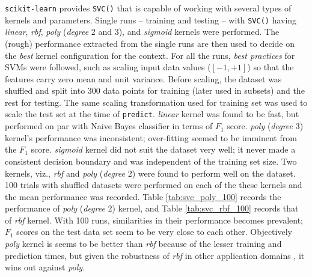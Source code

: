 \documentclass{article}
\begin{document}
	\texttt{scikit-learn} provides \texttt{SVC()} that is capable of working with several types of kernels and parameters. Single runs -- training and testing -- with \texttt{SVC()} having \emph{linear}, \emph{rbf}, \emph{poly} (\emph{degree} 2 and 3), and \emph{sigmoid} kernels were performed. The (rough) performance extracted from the single runs are then used to decide on the \emph{best} kernel configuration for the context. For all the runs, \emph{best practices} for SVMs \cite{hsu2003} were followed, such as scaling input data values ($[-1,+1]$) so that the features carry zero mean and unit variance. Before scaling, the dataset was shuffled and split into 300 data points for training (later used in subsets) and the rest for testing. The same scaling transformation used for training set was used to scale the test set at the time of \texttt{predict}. \emph{linear} kernel was found to be fast, but performed on par with Naive Bayes classifier in terms of $F_1$ score. \emph{poly} (\emph{degree} 3) kernel's performance was inconsistent; over-fitting seemed to be imminent from the $F_1$ score. \emph{sigmoid} kernel did not suit the dataset very well; it never made a consistent decision boundary and was independent of the training set size. Two kernels, viz., \emph{rbf} and \emph{poly} (\emph{degree} 2) were found to perform well on the dataset. 100 trials with shuffled datasets were performed on each of the these kernels and the mean performance was recorded. Table \ref{tab:svc_poly_100} records the performance of \emph{poly} (\emph{degree} 2) kernel, and Table \ref{tab:svc_rbf_100} records that of \emph{rbf} kernel. With 100 runs, similarities in their performance becomes prevalent; $F_1$ scores on the test data set seem to be very close to each other. Objectively \emph{poly} kernel is seems to be better than \emph{rbf} because of the lesser training and prediction times, but given the robustness of \emph{rbf} in other application domains \cite{hsu2003}, it wins out against \emph{poly}.  
	
\end{document}
